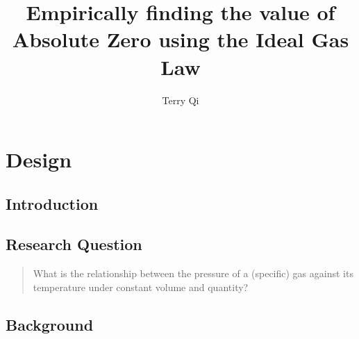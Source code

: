 \documentclass[a4paper,12pt]{article}
\title{Empirically finding the value of Absolute Zero using the Ideal Gas Law}
\author{Terry Qi}
\begin{document}
\maketitle

\section{Design}
\subsection{Introduction}

\subsection{Research Question}
\begin{quote}
    What is the relationship between the pressure of a (specific) gas against its temperature under constant volume and quantity?
\end{quote}

\subsection{Background}
\end{document}
